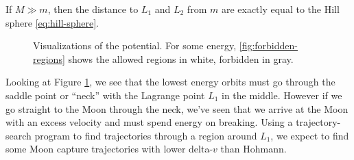 If $M \gg m$, then the distance to $L_1$ and $L_2$ from $m$ are exactly equal to the Hill sphere \eqref{eq:hill-sphere}.

\begin{figure}[ht]
    \centering
        \caption{Visualizations of the potential. For some energy, \ref{fig:forbidden-regions} shows the allowed regions in white, forbidden in gray.}
    \label{fig:potential-visualizations}
\end{figure}
Looking at Figure \ref{fig:potential-visualizations}, we see that the lowest energy orbits must go through the saddle point or ``neck'' with the Lagrange point $L_1$ in the middle. However if we go straight to the Moon through the neck, we've seen that we arrive at the Moon with an excess velocity and must spend energy on breaking. Using a trajectory-search program to find trajectories through a region around $L_1$, we expect to find some Moon capture trajectories with lower delta-$v$ than Hohmann.
